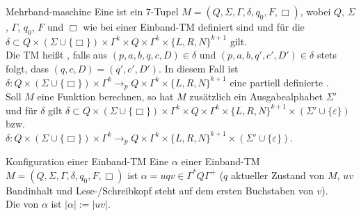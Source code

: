 \begin{Def}{Mehrband-maschine}
    \hspace*{-0.1mm}%
    Eine  ist ein $7$-Tupel
    $M = (Q, \Sigma, \Gamma, \delta, q_0, F, \Box)$, wobei
    $Q$, $\Sigma$, $\Gamma$, $q_0$, $F$ und $\Box$ wie bei einer Einband-TM definiert sind
    und für die \\
    $\delta \subset Q \times (\Sigma \cup \{\Box\}) \times \Gamma^k \times Q \times
    \Gamma^k \times \{L, R, N\}^{k+1}$ gilt.\\
    Die TM heißt , falls aus
    $(p, a, b, q, c, D) \in \delta$ und $(p, a, b, q', c', D') \in \delta$ stets folgt, dass
    $(q, c, D) = (q', c', D')$.
    In diesem Fall ist
    $\delta\colon Q \times (\Sigma \cup \{\Box\}) \times \Gamma^k \rightarrow_p Q \times
    \Gamma^k \times \{L, R, N\}^{k+1}$
    eine partiell definierte .\\
    Soll $M$ eine Funktion berechnen, so hat $M$ zusätzlich ein Ausgabealphabet $\Sigma'$
    und für $\delta$ gilt
    $\delta \subset Q \times (\Sigma \cup \{\Box\}) \times \Gamma^k \times Q \times
    \Gamma^k \times \{L, R, N\}^{k+1} \times (\Sigma' \cup \{\varepsilon\})$ bzw.\\
    $\delta\colon Q \times (\Sigma \cup \{\Box\}) \times \Gamma^k \rightarrow_p Q \times
    \Gamma^k \times \{L, R, N\}^{k+1} \times (\Sigma' \cup \{\varepsilon\})$.
\end{Def}

\linie

\begin{Def}{Konfiguration einer Einband-TM}
    Eine  $\alpha$ einer Einband-TM\\
    $M = (Q, \Sigma, \Gamma, \delta, q_0, F, \Box)$ ist
    $\alpha = uqv \in \Gamma^\ast Q \Gamma^+$
    ($q$ aktueller Zustand von $M$, $uv$ Bandinhalt und Lese-/Schreibkopf steht auf dem ersten
    Buchstaben von $v$).\\
    Die  von $\alpha$ ist $|\alpha| := |uv|$.
\end{Def}

